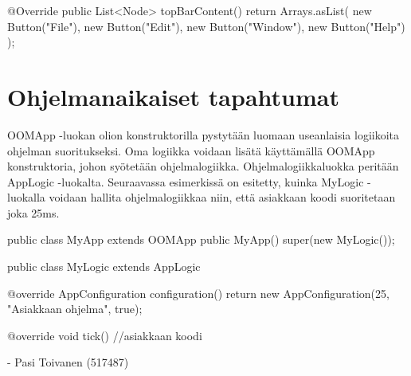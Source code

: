\begin{javacode}
@Override
public List<Node> topBarContent() {
	return Arrays.asList(
		new Button("File"),
		new Button("Edit"),
		new Button("Window"),
		new Button("Help")
	);
}
\end{javacode}

\section{Ohjelmanaikaiset tapahtumat}

\label{D}

OOMApp -luokan olion konstruktorilla pystytään luomaan useanlaisia logiikoita
ohjelman suoritukseksi. Oma logiikka voidaan lisätä käyttämällä OOMApp
konstruktoria, johon syötetään ohjelmalogiikka. Ohjelmalogiikkaluokka peritään
AppLogic -luokalta. Seuraavassa esimerkissä on esitetty, kuinka MyLogic
-luokalla voidaan hallita ohjelmalogiikkaa niin, että asiakkaan koodi
suoritetaan joka 25ms.

\begin{javacode}
public class MyApp extends OOMApp {
	public MyApp() {
		super(new MyLogic());
	}
}

public class MyLogic extends AppLogic {
	@override
	AppConfiguration configuration() {
		return new AppConfiguration(25, "Asiakkaan ohjelma", true);
	}
    
	@override
	void tick() {
		//asiakkaan koodi
	}
}
\end{javacode}

- Pasi Toivanen (517487)
